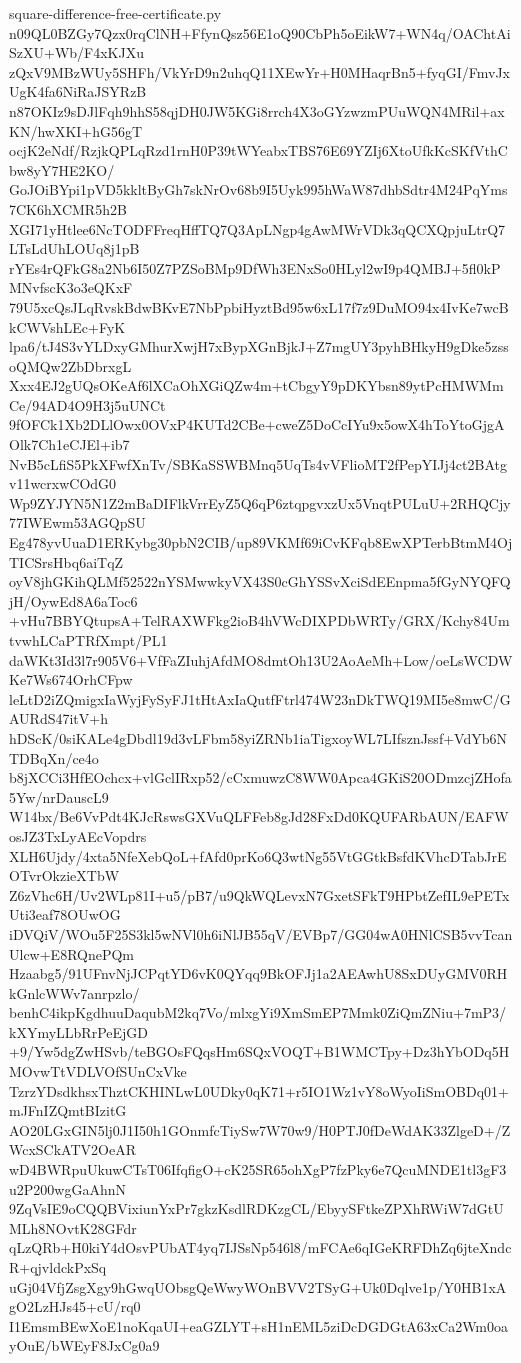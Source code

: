 \documentclass[11pt]{article}
\theoremstyle{definition}
\theoremstyle{remark}
\begin{document}
\begin{filecontents*}[overwrite]{square-difference-free-certificate.py}
n09QL0BZGy7Qzx0rqClNH+FfynQsz56E1oQ90CbPh5oEikW7+WN4q/OAChtAiSzXU+Wb/F4xKJXu
zQxV9MBzWUy5SHFh/VkYrD9n2uhqQ11XEwYr+H0MHaqrBn5+fyqGI/FmvJxUgK4fa6NiRaJSYRzB
n87OKIz9sDJlFqh9hhS58qjDH0JW5KGi8rrch4X3oGYzwzmPUuWQN4MRil+axKN/hwXKI+hG56gT
ocjK2eNdf/RzjkQPLqRzd1rnH0P39tWYeabxTBS76E69YZIj6XtoUfkKcSKfVthCbw8yY7HE2KO/
GoJOiBYpi1pVD5kkltByGh7skNrOv68b9I5Uyk995hWaW87dhbSdtr4M24PqYms7CK6hXCMR5h2B
XGI71yHtlee6NcTODFFreqHffTQ7Q3ApLNgp4gAwMWrVDk3qQCXQpjuLtrQ7LTsLdUhLOUq8j1pB
rYEs4rQFkG8a2Nb6I50Z7PZSoBMp9DfWh3ENxSo0HLyl2wI9p4QMBJ+5fl0kPMNvfscK3o3eQKxF
79U5xcQsJLqRvskBdwBKvE7NbPpbiHyztBd95w6xL17f7z9DuMO94x4IvKe7wcBkCWVshLEc+FyK
lpa6/tJ4S3vYLDxyGMhurXwjH7xBypXGnBjkJ+Z7mgUY3pyhBHkyH9gDke5zssoQMQw2ZbDbrxgL
Xxx4EJ2gUQsOKeAf6lXCaOhXGiQZw4m+tCbgyY9pDKYbsn89ytPcHMWMmCe/94AD4O9H3j5uUNCt
9fOFCk1Xb2DLlOwx0OVxP4KUTd2CBe+cweZ5DoCcIYu9x5owX4hToYtoGjgAOlk7Ch1eCJEl+ib7
NvB5cLfiS5PkXFwfXnTv/SBKaSSWBMnq5UqTs4vVFlioMT2fPepYIJj4ct2BAtgv11wcrxwCOdG0
Wp9ZYJYN5N1Z2mBaDIFlkVrrEyZ5Q6qP6ztqpgvxzUx5VnqtPULuU+2RHQCjy77IWEwm53AGQpSU
Eg478yvUuaD1ERKybg30pbN2CIB/up89VKMf69iCvKFqb8EwXPTerbBtmM4OjTICSrsHbq6aiTqZ
oyV8jhGKihQLMf52522nYSMwwkyVX43S0cGhYSSvXciSdEEnpma5fGyNYQFQjH/OywEd8A6aToc6
+vHu7BBYQtupsA+TelRAXWFkg2ioB4hVWcDIXPDbWRTy/GRX/Kchy84UmtvwhLCaPTRfXmpt/PL1
daWKt3Id3l7r905V6+VfFaZIuhjAfdMO8dmtOh13U2AoAeMh+Low/oeLsWCDWKe7Ws674OrhCFpw
leLtD2iZQmigxIaWyjFySyFJ1tHtAxIaQutfFtrl474W23nDkTWQ19MI5e8mwC/GAURdS47itV+h
hDScK/0siKALe4gDbdl19d3vLFbm58yiZRNb1iaTigxoyWL7LIfsznJssf+VdYb6NTDBqXn/ce4o
b8jXCCi3HfEOchcx+vlGclIRxp52/cCxmuwzC8WW0Apca4GKiS20ODmzcjZHofa5Yw/nrDauscL9
W14bx/Be6VvPdt4KJcRswsGXVuQLFFeb8gJd28FxDd0KQUFARbAUN/EAFWosJZ3TxLyAEcVopdrs
XLH6Ujdy/4xta5NfeXebQoL+fAfd0prKo6Q3wtNg55VtGGtkBsfdKVhcDTabJrEOTvrOkzieXTbW
Z6zVhc6H/Uv2WLp81I+u5/pB7/u9QkWQLevxN7GxetSFkT9HPbtZefIL9ePETxUti3eaf78OUwOG
iDVQiV/WOu5F25S3kl5wNVl0h6iNlJB55qV/EVBp7/GG04wA0HNlCSB5vvTcanUlcw+E8RQnePQm
Hzaabg5/91UFnvNjJCPqtYD6vK0QYqq9BkOFJj1a2AEAwhU8SxDUyGMV0RHkGnlcWWv7anrpzlo/
benhC4ikpKgdhuuDaqubM2kq7Vo/mlxgYi9XmSmEP7Mmk0ZiQmZNiu+7mP3/kXYmyLLbRrPeEjGD
+9/Yw5dgZwHSvb/teBGOsFQqsHm6SQxVOQT+B1WMCTpy+Dz3hYbODq5HMOvwTtVDLVOfSUnCxVke
TzrzYDsdkhsxThztCKHINLwL0UDky0qK71+r5IO1Wz1vY8oWyoIiSmOBDq01+mJFnIZQmtBIzitG
AO20LGxGIN5lj0J1I50h1GOnmfcTiySw7W70w9/H0PTJ0fDeWdAK33ZlgeD+/ZWcxSCkATV2OeAR
wD4BWRpuUkuwCTsT06IfqfigO+cK25SR65ohXgP7fzPky6e7QcuMNDE1tl3gF3u2P200wgGaAhnN
9ZqVsIE9oCQQBVixiunYxPr7gkzKsdlRDKzgCL/EbyySFtkeZPXhRWiW7dGtUMLh8NOvtK28GFdr
qLzQRb+H0kiY4dOsvPUbAT4yq7IJSsNp546l8/mFCAe6qIGeKRFDhZq6jteXndcR+qjvldckPxSq
uGj04VfjZsgXgy9hGwqUObsgQeWwyWOnBVV2TSyG+Uk0Dqlve1p/Y0HB1xAgO2LzHJs45+cU/rq0
I1EmsmBEwXoE1noKqaUI+eaGZLYT+sH1nEML5ziDcDGDGtA63xCa2Wm0oayOuE/bWEyF8JxCg0a9

\end{filecontents*}
\end{document}
